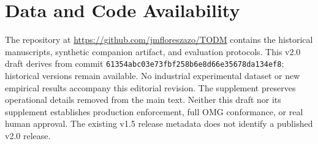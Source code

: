 \documentclass[11pt,a4paper]{article}
\begin{document}
\section*{Data and Code Availability}
The repository at \url{https://github.com/jmfloreszazo/TODM} contains the historical manuscripts, synthetic companion artifact, and evaluation protocols. This v2.0 draft derives from commit \texttt{61354abc03e73fbf258b6e8d66e35678da134ef8}; historical versions remain available. No industrial experimental dataset or new empirical results accompany this editorial revision. The supplement preserves operational details removed from the main text. Neither this draft nor its supplement establishes production enforcement, full OMG conformance, or real human approval. The existing v1.5 release metadata does not identify a published v2.0 release.



\end{document}

